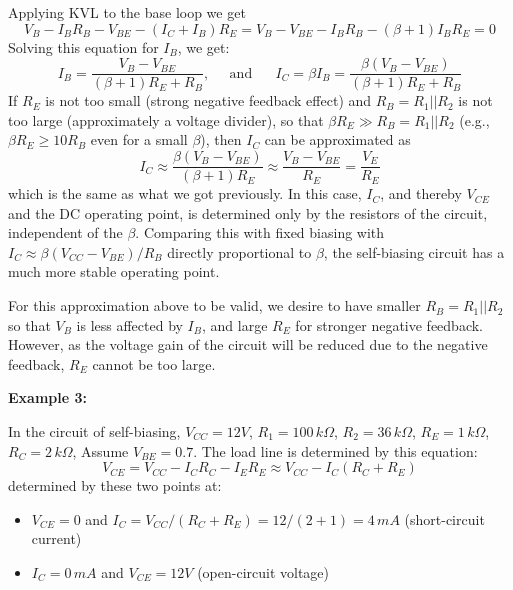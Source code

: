 \documentclass{article}
\begin{document}
\begin{itemize}
  Applying KVL to the base loop we get 
  \begin{equation}
    V_B-I_BR_B-V_{BE}-(I_C+I_B)R_E=V_B-V_{BE}-I_BR_B-(\beta+1)I_BR_E=0 
  \end{equation}
  Solving this equation for $I_B$, we get:
  \begin{equation}
    I_B=\frac{V_B-V_{BE}}{(\beta+1) R_E+R_B},\;\;\;\;\;\mbox{and}\;\;\;\;\;\;
    I_C =\beta I_B=\frac{\beta(V_B-V_{BE})}{(\beta+1) R_E+R_B} 
  \end{equation}
  If $R_E$ is not too small (strong negative feedback effect) and 
  $R_B=R_1||R_2$ is not too large (approximately a voltage divider), 
  so that $\beta R_E \gg R_B=R_1||R_2$ (e.g., $\beta R_E \ge 10 R_B$ 
  even for a small $\beta$), then $I_C$ can be approximated as
  \begin{equation}
    I_C \approx \frac{\beta(V_B-V_{BE})}{(\beta+1)R_E} 
    \approx \frac{V_B-V_{BE}}{R_E} =\frac{V_E}{R_E} 
  \end{equation}
  which is the same as what we got previously. 
  In this case, $I_C$, and thereby $V_{CE}$ and the DC operating point, 
  is determined only by the resistors of the circuit, independent of the 
  $\beta$. Comparing this with fixed biasing with $
  I_C \approx \beta (V_{CC}-V_{BE})/R_B$ directly proportional to $\beta$,
  the self-biasing circuit has a much more stable operating point.

  For this approximation above to be valid, we desire to have smaller 
  $R_B=R_1||R_2$ so that $V_B$ is less affected by $I_B$, and large 
  $R_E$ for stronger negative feedback. However, as the voltage gain of
  the circuit will be reduced due to the negative feedback, $R_E$ cannot
  be too large.

\end{itemize}

{\bf Example 3:} 

In the circuit of self-biasing, $V_{CC}=12V$, $R_1=100\,k\Omega$, 
$R_2=36\,k\Omega$, $R_E=1\,k\Omega$, $R_C=2\,k\Omega$, Assume 
$V_{BE}=0.7$. The load line is determined by this equation:
\begin{equation}
  V_{CE}=V_{CC}-I_CR_C-I_ER_E\approx V_{CC}-I_C(R_C+R_E)
\end{equation}
determined by these two points at:
\begin{itemize}
\item $V_{CE}=0$ and $I_C=V_{CC}/(R_C+R_E)=12/(2+1)=4\,mA$ (short-circuit current)
\item $I_C=0\,mA$ and $V_{CE}=12V$ (open-circuit voltage)
\end{itemize}
\end{document}
